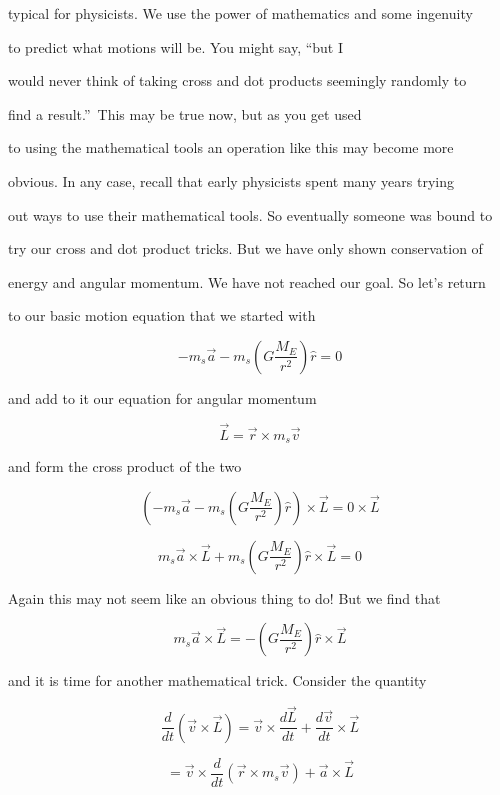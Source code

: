 typical for physicists. We use the power of mathematics and some ingenuity

to predict what motions will be. You might say, \textquotedblleft but I\

would never think of taking cross and dot products seemingly randomly to

find a result.\textquotedblright\ This may be true now, but as you get used

to using the mathematical tools an operation like this may become more

obvious. In any case, recall that early physicists spent many years trying

out ways to use their mathematical tools. So eventually someone was bound to

try our cross and dot product tricks. But we have only shown conservation of

energy and angular momentum. We have not reached our goal. So let's return

to our basic motion equation that we started with%

$$-m_{s}\overrightarrow{a}-m_{s}\left( G\frac{M_{E}}{r^{2}}\right) \hat{r}=0 $$

and add to it our equation for angular momentum 

$$\overrightarrow{L}=\overrightarrow{r}\times m_{s}\overrightarrow{v}$$

and form the cross product of the two%

$$\left( -m_{s}\overrightarrow{a}-m_{s}\left( G\frac{M_{E}}{r^{2}}\right) \hat{r}\right) \times \overrightarrow{L}=0\times \overrightarrow{L}$$

$$m_{s}\overrightarrow{a}\times \overrightarrow{L}+m_{s}\left( G\frac{M_{E}}{r^{2}}\right) \hat{r}\times \overrightarrow{L}=0 $$

Again this may not seem like an obvious thing to do! But we find that 

$$m_{s}\overrightarrow{a}\times \overrightarrow{L}=-\left( G\frac{M_{E}}{r^{2}}\right) \hat{r}\times \overrightarrow{L}$$

and it is time for another mathematical trick. Consider the quantity%

$$\frac{d}{dt}\left( \overrightarrow{v}\times \overrightarrow{L}\right) =\overrightarrow{v}\times \frac{d\overrightarrow{L}}{dt}+\frac{d\overrightarrow{v}}{dt}\times \overrightarrow{L}$$

$$=\overrightarrow{v}\times \frac{d}{dt}\left( \overrightarrow{r}\times m_{s}\overrightarrow{v}\right) +\overrightarrow{a}\times \overrightarrow{L}$$

